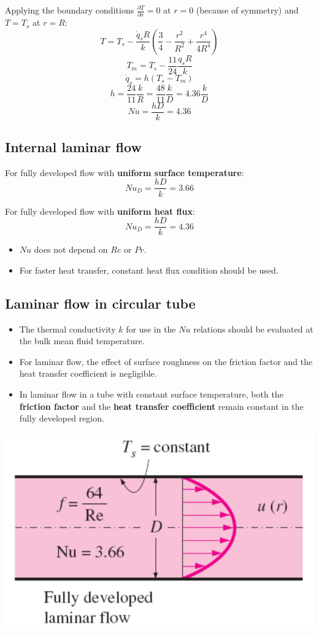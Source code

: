 \documentclass[11pt]{article}
\begin{document}
Applying the boundary conditions \(\frac{\partial T}{\partial x} = 0\) at \(r = 0\) (because of symmetry) and \(T = T_s\) at \(r = R\):
\[T = T_s - \frac{\dot{q}_s R}{k} \left(\frac{3}{4} - \frac{r^2}{R^2} + \frac{r^4}{4R^4} \right)\]
\[T_m = T_s - \frac{11}{24} \frac{{q}_s R}{k}\]
\[\dot{q}_s = h(T_s - T_m)\]
\[h = \frac{24}{11} \frac{k}{R} = \frac{48}{11} \frac{k}{D} = 4.36 \frac{k}{D}\]
\[Nu = \frac{hD}{k} = 4.36\]
\subsection{Internal laminar flow}
\label{sec:orgae11d77}
For fully developed flow with \textbf{uniform surface temperature}:
\[Nu_D = \frac{hD}{k} = 3.66\]

For fully developed flow with \textbf{uniform heat flux}:
\[Nu_D = \frac{hD}{k} = 4.36\]

\begin{itemize}
\item \(Nu\) does not depend on \(Re\) or \(Pr\).
\item For faster heat transfer, constant heat flux condition should be used.
\end{itemize}
\subsection{Laminar flow in circular tube}
\label{sec:orgbb5bc39}
\begin{itemize}
\item The thermal conductivity \(k\) for use in the \(Nu\) relations should be evaluated at the bulk mean fluid temperature.
\item For laminar flow, the effect of surface roughness on the friction factor and the heat transfer coefficient is negligible.
\item In laminar flow in a tube with constant surface temperature, both the \textbf{friction factor} and the \textbf{heat transfer coefficient} remain constant in the fully developed region.
\end{itemize}

\begin{center}
\includegraphics[width=.9\linewidth]{./images/laminar-flow-in-circular-tube-diagram.png}
\end{center}
\end{document}
